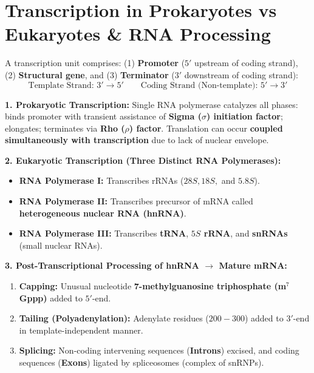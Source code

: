 \documentclass[10pt,twoside,openright]{book}
\begin{document}
\section{Transcription in Prokaryotes vs Eukaryotes \& RNA Processing}

\begin{conceptbox}
A transcription unit comprises: (1) \textbf{Promoter} ($5'$ upstream of coding strand), (2) \textbf{Structural gene}, and (3) \textbf{Terminator} ($3'$ downstream of coding strand):
\begin{equation}
  \text{Template Strand: } 3' \longrightarrow 5' \qquad \text{Coding Strand (Non-template): } 5' \longrightarrow 3'
\end{equation}

\textbf{1. Prokaryotic Transcription:}
Single RNA polymerase catalyzes all phases: binds promoter with transient assistance of \textbf{Sigma ($\sigma$) initiation factor}; elongates; terminates via \textbf{Rho ($\rho$) factor}. Translation can occur \textbf{coupled simultaneously with transcription} due to lack of nuclear envelope.

\textbf{2. Eukaryotic Transcription (Three Distinct RNA Polymerases):}
\begin{itemize}
  \item \textbf{RNA Polymerase I:} Transcribes rRNAs ($28S, 18S,$ and $5.8S$).
  \item \textbf{RNA Polymerase II:} Transcribes precursor of mRNA called \textbf{heterogeneous nuclear RNA (hnRNA)}.
  \item \textbf{RNA Polymerase III:} Transcribes \textbf{tRNA}, \textbf{$5S$ rRNA}, and \textbf{snRNAs} (small nuclear RNAs).
\end{itemize}

\textbf{3. Post-Transcriptional Processing of hnRNA $\to$ Mature mRNA:}
\begin{enumerate}
  \item \textbf{Capping:} Unusual nucleotide \textbf{7-methylguanosine triphosphate (m$^7$Gppp)} added to $5'$-end.
  \item \textbf{Tailing (Polyadenylation):} Adenylate residues ($200-300$) added to $3'$-end in template-independent manner.
  \item \textbf{Splicing:} Non-coding intervening sequences (\textbf{Introns}) excised, and coding sequences (\textbf{Exons}) ligated by spliceosomes (complex of snRNPs).
\end{enumerate}
\end{conceptbox}
\end{document}
